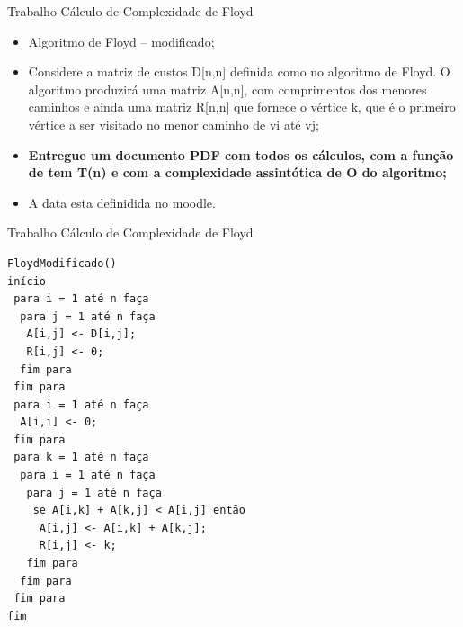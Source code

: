 \documentclass[12pt,table,xcolor={dvipsnames}]{beamer}
\begin{document}
\begin{frame}[fragile]{Trabalho Cálculo de Complexidade de Floyd}
\begin{itemize}
\item Algoritmo de Floyd – modificado;
\item Considere a matriz de custos D[n,n] definida como no algoritmo de Floyd. O algoritmo produzirá uma matriz A[n,n], com comprimentos dos menores caminhos e ainda uma matriz R[n,n] que fornece o vértice k, que é o primeiro vértice a ser visitado no menor caminho de vi até vj;
\item \textbf{Entregue um documento PDF com todos os cálculos, com a função de tem T(n) e com a complexidade assintótica de O do algoritmo;}
\item A data esta definidida no moodle.
\end{itemize}
\end{frame}

\begin{frame}[fragile]{Trabalho Cálculo de Complexidade de Floyd}
\begin{lstlisting}
FloydModificado()
início
 para i = 1 até n faça
  para j = 1 até n faça
   A[i,j] <- D[i,j];
   R[i,j] <- 0;
  fim para
 fim para
 para i = 1 até n faça
  A[i,i] <- 0;
 fim para
 para k = 1 até n faça
  para i = 1 até n faça
   para j = 1 até n faça
    se A[i,k] + A[k,j] < A[i,j] então
     A[i,j] <- A[i,k] + A[k,j];
     R[i,j] <- k;
   fim para
  fim para
 fim para
fim
\end{lstlisting}
\end{frame}
\end{document}
